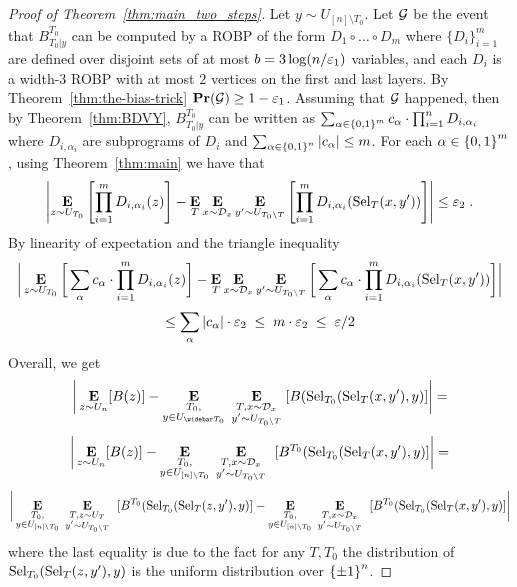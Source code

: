 \begin{proof}[Proof of Theorem~\ref{thm:main_two_steps}]
Let $y\sim U_{[n]\setminus T_0}$. Let ${\cal G}$ be the event that $B^{T_0}_{T_0|y}$  can be computed by a ROBP of the form $D_1\circ \ldots \circ D_m$  where $\{D_i\}_{i=1}^{m}$ are defined over disjoint sets of at most $b=3\log(n/\varepsilon_1)$ variables, and each $D_i$ is a width-$3$ ROBP with at most $2$ vertices on the first and last layers.
By Theorem~\ref{thm:the-bias-trick} $\mathop{\bf Pr\/}({\cal G}) \ge 1-\varepsilon_1$. 
Assuming that ${\cal G}$ happened, then by Theorem~\ref{thm:BDVY},
$B^{T_0}_{T_0|y}$ can be written as 
$\sum_{\alpha \in {\{0,1\}}^m} c_{\alpha} \cdot \prod_{i=1}^{n}D_{i,\alpha_i}$
	where $D_{i,\alpha_i}$ are subprograms of $D_{i}$ and $\sum_{\alpha\in {\{0,1\}}^n}{|c_\alpha|} \le m$.
For each $\alpha\in {\{0,1\}}^m$, using Theorem~\ref{thm:main} we have that 
$$
\left| 
\mathop{\bf E\/}_{z\sim U_{T_0}}\left[\prod_{i=1}^{m}D_{i,\alpha_i}(z)\right]
- \mathop{\bf E\/}_{T}\mathop{\bf E\/}_{x\sim {\mathcal{D}_x}}\mathop{\bf E\/}_{y' \sim U_{T_0 \setminus T}} \left[\prod_{i=1}^{m}D_{i,\alpha_i}(\mathrm{Sel}_{T}(x, y'))\right]
 \right| 
 \le \varepsilon_2\;.
$$
By linearity of expectation and the triangle inequality
$$
\bigg|\mathop{\bf E\/}_{z\sim U_{T_0}}\bigg[\sum_{\alpha} c_{\alpha} \cdot \prod_{i=1}^{m}D_{i,\alpha_i}(z)\bigg] - \mathop{\bf E\/}_{T}\mathop{\bf E\/}_{x\sim {\mathcal{D}_x}}\mathop{\bf E\/}_{y' \sim U_{T_0 \setminus T}}
 \bigg[\sum_{\alpha} c_{\alpha} \cdot \prod_{i=1}^{m} D_{i,\alpha_i}(\mathrm{Sel}_{T}(x, y'))\bigg]\bigg|$$
$$\le \sum_{\alpha}{|c_{\alpha}|} \cdot  \varepsilon_2 \;\le\; m \cdot \varepsilon_2 \;\le\; \varepsilon/2
$$
%
Overall, we get
%
$$\bigg|\E_{z\sim U_n}[B(z)]-
\E_{\substack{T_0,\\y\in U_{\bar{T_0}}}}\;
\E_{\substack{T, x\sim \Dx\\y' \sim U_{T_0 \setminus T}}}\;
[B(\Sel_{T_0}(\Sel_T(x,y'),y)]\bigg| =
$$
$$ 
\bigg|\mathop{\bf E\/}_{z\sim U_n}[B(z)]-
\mathop{\bf E\/}_{\substack{T_0,\\y\in U_{[n]\setminus T_0}}}\;
\mathop{\bf E\/}_{\substack{T, x\sim {\mathcal{D}_x}\\y' \sim U_{T_0 \setminus T}}}\;\
[B^{T_0}(\mathrm{Sel}_{T_0}(\mathrm{Sel}_T(x,y'),y)]\bigg| = 
$$
\begin{equation}\label{eq:aa}
	\bigg|\mathop{\bf E\/}_{\substack{T_0,\\y\in U_{[n]\setminus T_0}}}\;
\mathop{\bf E\/}_{\substack{T, z\sim U_{T} \\y' \sim U_{T_0 \setminus T}}}\;\
[B^{T_0}(\mathrm{Sel}_{T_0}(\mathrm{Sel}_T(z,y'),y)]-
\mathop{\bf E\/}_{\substack{T_0,\\y\in U_{[n]\setminus T_0}}}\;
\mathop{\bf E\/}_{\substack{T, x\sim {\mathcal{D}_x}\\y' \sim U_{T_0 \setminus T}}}\;\
[B^{T_0}(\mathrm{Sel}_{T_0}(\mathrm{Sel}_T(x,y'),y)]\bigg|
\end{equation}
where the last equality is due to the fact for any $T,T_0$ the distribution of $\mathrm{Sel}_{T_0}(\mathrm{Sel}_T(z,y'),y)$ is the uniform distribution over ${\{\pm1\}}^{n}$.

\end{proof}
